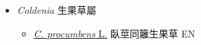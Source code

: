 
  \begin{itemize}
 \item[] \textit{Coldenia} 生果草屬
                                
  \begin{itemize}
        \item[] \href{http://www.theplantlist.org/tpl1.1/search?q=Coldenia+procumbens}{\textit{C. procumbens} L.}   臥莖同籬生果草   EN
  \end{itemize}
  \end{itemize}
